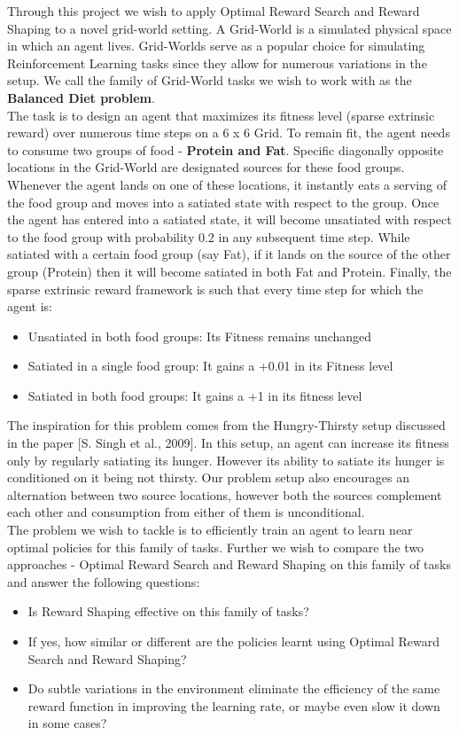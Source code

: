 \documentclass[11pt]{article}
\begin{document}
Through this project we wish to apply Optimal Reward Search and Reward Shaping to a novel grid-world setting. A Grid-World is a simulated physical space in which an agent lives. Grid-Worlds serve as a popular choice for simulating Reinforcement Learning tasks since they allow for numerous variations in the setup. We call the family of Grid-World tasks we wish to work with as the \textbf{Balanced Diet problem}.\\ 
The task is to design an agent that maximizes its fitness level (sparse extrinsic reward) over numerous time steps on a 6 x 6 Grid. To remain fit, the agent needs to consume two groups of food - \textbf{Protein and Fat}. Specific diagonally opposite locations in the Grid-World are designated sources for these food groups. Whenever the agent lands on one of these locations, it instantly eats a serving of the food group and moves into a satiated state with respect to the group. Once the agent has entered into a satiated state, it will become unsatiated with respect to the food group with probability 0.2 in any subsequent time step. While satiated with a certain food group (say Fat), if it lands on the source of the other group (Protein) then it will become satiated in both Fat and Protein. Finally, the sparse extrinsic reward framework is such that every time step for which the agent is:
\begin{itemize}
\item Unsatiated in both food groups: Its Fitness remains unchanged
\item Satiated in a single food group: It gains a +0.01 in its Fitness level
\item Satiated in both food groups: It gains a +1 in its fitness level
\end{itemize}
The inspiration for this problem comes from the Hungry-Thirsty setup discussed in the paper [S. Singh et al., 2009]. In this setup, an agent can increase its fitness only by regularly satiating its hunger. However its ability to satiate its hunger is conditioned on it being not thirsty. Our problem setup also encourages an alternation between two source locations, however both the sources complement each other and consumption from either of them is unconditional.\\
The problem we wish to tackle is to efficiently train an agent to learn near optimal policies for this family of tasks. Further we wish to compare the two approaches - Optimal Reward Search and Reward Shaping on this family of tasks and answer the following questions:
\begin{itemize}
	\item Is Reward Shaping effective on this family of tasks?
	\item If yes, how similar or different are the policies learnt using Optimal Reward Search and Reward Shaping?
	\item Do subtle variations in the environment eliminate the efficiency of the same reward function in improving the learning rate, or maybe even slow it down in some cases?
\end{itemize}
\end{document}
